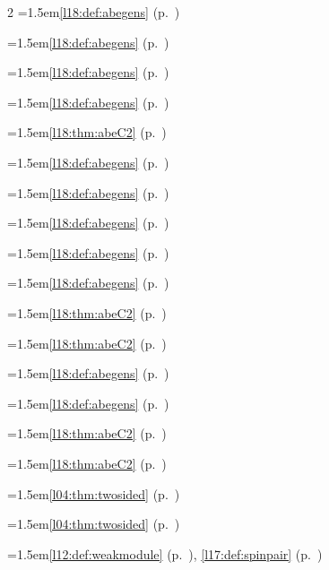 \begin{multicols}{2}
\hangindent=1.5em\quad \ref{l18:def:abegens} (p.~\pageref{l18:def:abegens})\par
\hangindent=1.5em\quad \ref{l18:def:abegens} (p.~\pageref{l18:def:abegens})\par
\hangindent=1.5em\quad \ref{l18:def:abegens} (p.~\pageref{l18:def:abegens})\par
\hangindent=1.5em\quad \ref{l18:def:abegens} (p.~\pageref{l18:def:abegens})\par
\hangindent=1.5em\quad \ref{l18:thm:abeC2} (p.~\pageref{l18:thm:abeC2})\par
\hangindent=1.5em\quad \ref{l18:def:abegens} (p.~\pageref{l18:def:abegens})\par
\hangindent=1.5em\quad \ref{l18:def:abegens} (p.~\pageref{l18:def:abegens})\par
\hangindent=1.5em\quad \ref{l18:def:abegens} (p.~\pageref{l18:def:abegens})\par
\hangindent=1.5em\quad \ref{l18:def:abegens} (p.~\pageref{l18:def:abegens})\par
\hangindent=1.5em\quad \ref{l18:def:abegens} (p.~\pageref{l18:def:abegens})\par
\hangindent=1.5em\quad \ref{l18:thm:abeC2} (p.~\pageref{l18:thm:abeC2})\par
\hangindent=1.5em\quad \ref{l18:thm:abeC2} (p.~\pageref{l18:thm:abeC2})\par
\hangindent=1.5em\quad \ref{l18:def:abegens} (p.~\pageref{l18:def:abegens})\par
\hangindent=1.5em\quad \ref{l18:def:abegens} (p.~\pageref{l18:def:abegens})\par
\hangindent=1.5em\quad \ref{l18:thm:abeC2} (p.~\pageref{l18:thm:abeC2})\par
\hangindent=1.5em\quad \ref{l18:thm:abeC2} (p.~\pageref{l18:thm:abeC2})\par
\hangindent=1.5em\quad \ref{l04:thm:twosided} (p.~\pageref{l04:thm:twosided})\par
\hangindent=1.5em\quad \ref{l04:thm:twosided} (p.~\pageref{l04:thm:twosided})\par
\hangindent=1.5em\quad \ref{l12:def:weakmodule} (p.~\pageref{l12:def:weakmodule}), \ref{l17:def:spinpair} (p.~\pageref{l17:def:spinpair})\par

\end{multicols}

